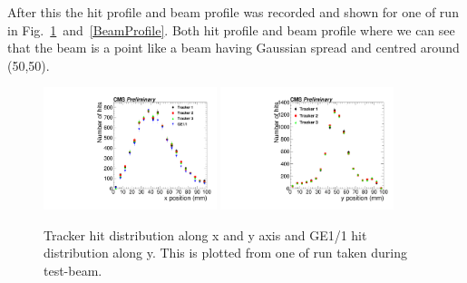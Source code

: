 After this the hit profile and beam profile was recorded and shown for one of run in Fig.~\ref{HitPosXaxis}~and~\ref{BeamProfile}. Both hit profile and beam profile where we can see that the beam is a point like a beam having Gaussian spread and centred around (50,50).
\begin{figure}[!htbp]
\centering
\includegraphics[width=0.45\textwidth]{figures/GEM/Tracker_Hit_position_Run1644_x.pdf}%
\includegraphics[width=0.45\textwidth]{figures/GEM/Tracker_Hit_position_Run1644_y.pdf}
\caption{Tracker hit distribution along x and y axis and GE1/1 hit distribution along y. This is plotted from one of run taken during test-beam.}
\label{HitPosXaxis}
\end{figure}
